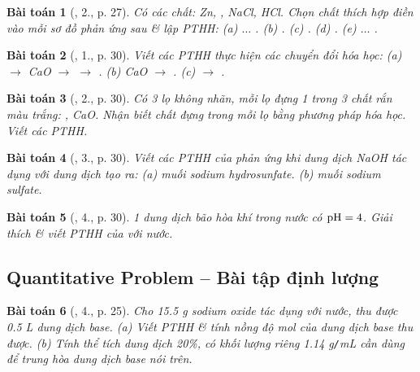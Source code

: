 \documentclass{article}
\newtheorem{baitoan}{Bài toán}
\begin{document}
\begin{baitoan}[\cite{SGK_Hoa_Hoc_9}, 2., p. 27]
	Có các chất: \emph{Zn, , NaCl, HCl}. Chọn chất thích hợp điền vào mỗi sơ đồ phản ứng sau \& lập PTHH: (a) \emph{$\ldots$ }. (b) \emph{}. (c) \emph{}. (d) \emph{}. (e) \emph{$\ldots$ }.
\end{baitoan}

\begin{baitoan}[\cite{SGK_Hoa_Hoc_9}, 1., p. 30]
	Viết các PTHH thực hiện các chuyển đổi hóa học: (a) \emph{ $\to$ CaO $\to$  $\to$ }. (b) \emph{CaO $\to$ }. (c) \emph{ $\to$ }.
\end{baitoan}

\begin{baitoan}[\cite{SGK_Hoa_Hoc_9}, 2., p. 30]
	Có 3 lọ không nhãn, mỗi lọ đựng 1 trong 3 chất rắn màu trắng: \emph{, CaO}. Nhận biết chất đựng trong mỗi lọ bằng phương pháp hóa học. Viết các PTHH.
\end{baitoan}

\begin{baitoan}[\cite{SGK_Hoa_Hoc_9}, 3., p. 30]
	Viết các PTHH của phản ứng khi dung dịch \emph{NaOH} tác dụng với dung dịch \emph{} tạo ra: (a) muối sodium hydrosunfate. (b) muối sodium sulfate.
\end{baitoan}

\begin{baitoan}[\cite{SGK_Hoa_Hoc_9}, 4., p. 30]
	1 dung dịch bão hòa khí \emph{} trong nước có $\rm pH = 4$. Giải thích \& viết PTHH của \emph{} với nước.
\end{baitoan}

\subsection{Quantitative Problem -- Bài tập định lượng}

\begin{baitoan}[\cite{SGK_Hoa_Hoc_9}, 4., p. 25]
	Cho \emph{15.5 g} sodium oxide \emph{} tác dụng với nước, thu được \emph{0.5 L} dung dịch base. (a) Viết PTHH \& tính nồng độ mol của dung dịch base thu được. (b) Tính thể tích dung dịch \emph{ 20\%}, có khối lượng riêng \emph{1.14 g\texttt{/}mL} cần dùng để trung hòa dung dịch base nói trên.
\end{baitoan}
\end{document}
